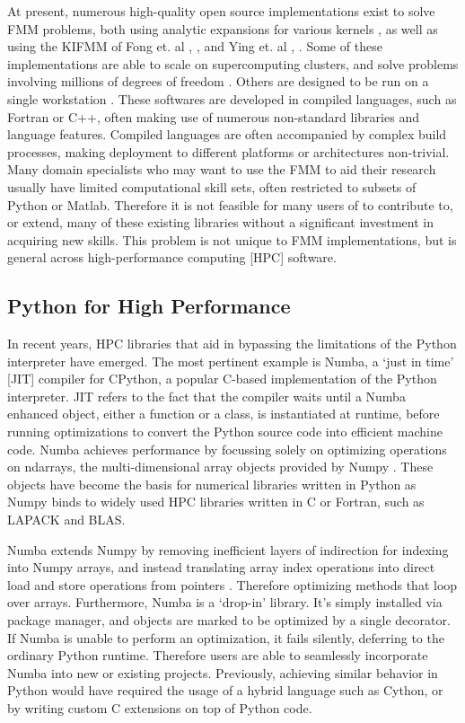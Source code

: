 \documentclass{IEEEcsmag}
\begin{document}
At present, numerous high-quality open source implementations exist to solve FMM problems, both using analytic expansions for various kernels \cite{Gimbutas2010}, as well as using the KIFMM of Fong et. al \cite{Bramas2020}, \cite{Agullo2016}, and Ying et. al \cite{Wang2021}, \cite{Lashuk2012}. Some of these implementations are able to scale on supercomputing clusters, and solve problems involving millions of degrees of freedom \cite{Lashuk2012}. Others are designed to be run on a single workstation \cite{Bramas2020, Wang2021}. These softwares are developed in compiled languages, such as Fortran or C++, often making use of numerous non-standard libraries and language features. Compiled languages are often accompanied by complex build processes, making deployment to different platforms or architectures non-trivial. Many domain specialists who may want to use the FMM to aid their research usually have limited computational skill sets, often restricted to subsets of Python or Matlab. Therefore it is not feasible for many users of to contribute to, or extend, many of these existing libraries without a significant investment in acquiring new skills. This problem is not unique to FMM implementations, but is general across high-performance computing [HPC] software.

\subsection{Python for High Performance}

In recent years, HPC libraries that aid in bypassing the limitations of the Python interpreter have emerged. The most pertinent example is Numba, a `just in time' [JIT] compiler for CPython, a popular C-based implementation of the Python interpreter. JIT refers to the fact that the compiler waits until a Numba enhanced object, either a function or a class, is instantiated at runtime, before running optimizations to convert the Python source code into efficient machine code. Numba achieves performance by focussing solely on optimizing operations on ndarrays, the multi-dimensional array objects provided by Numpy . These objects have become the basis for numerical libraries written in Python as Numpy binds to widely used HPC libraries written in C or Fortran, such as LAPACK and BLAS.

Numba extends Numpy by removing inefficient layers of indirection for indexing into Numpy arrays, and instead translating array index operations into direct load and store operations from pointers \cite{Lam2015}. Therefore optimizing methods that loop over arrays. Furthermore, Numba is a `drop-in' library. It's simply installed via package manager, and objects are marked to be optimized by a single decorator. If Numba is unable to perform an optimization, it fails silently, deferring to the ordinary Python runtime. Therefore users are able to seamlessly incorporate Numba into new or existing projects. Previously, achieving similar behavior in Python would have required the usage of a hybrid language such as Cython, or by writing custom C extensions on top of Python code.
\end{document}
